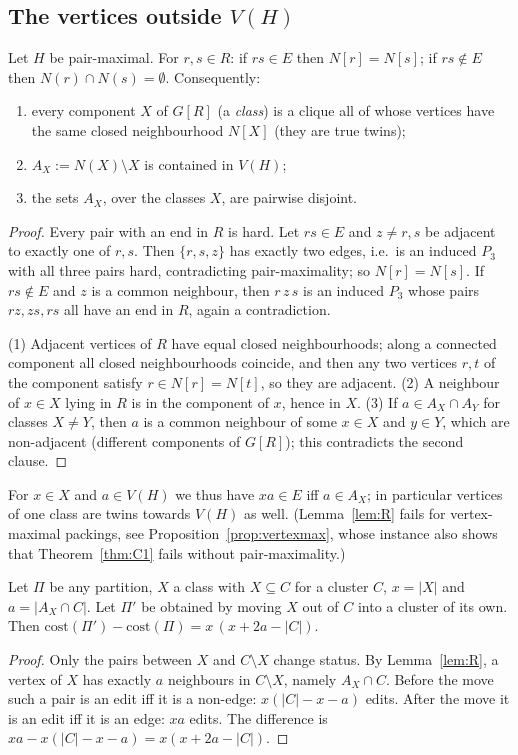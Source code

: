 \subsection{The vertices outside \texorpdfstring{$V(H)$}{V(H)}}
\begin{lemma}[Structure of $R$]\label{lem:R}
Let $H$ be pair-maximal. For $r,s\in R$: if $rs\in E$ then $N[r]=N[s]$; if $rs\notin E$ then $N(r)\cap N(s)=\emptyset$. Consequently:
\begin{enumerate}
\item every component $X$ of $G[R]$ (a \emph{class}) is a clique all of whose vertices have the same closed neighbourhood $N[X]$ (they are true twins);
\item $A_X:=N(X)\setminus X$ is contained in $V(H)$;
\item the sets $A_X$, over the classes $X$, are pairwise disjoint.
\end{enumerate}
\end{lemma}
\begin{proof}
Every pair with an end in $R$ is hard. Let $rs\in E$ and $z\ne r,s$ be adjacent to exactly one of $r,s$. Then $\{r,s,z\}$ has exactly two edges, i.e.\ is an induced $P_3$ with all three pairs hard, contradicting pair-maximality; so $N[r]=N[s]$. If $rs\notin E$ and $z$ is a common neighbour, then $r\,z\,s$ is an induced $P_3$ whose pairs $rz,zs,rs$ all have an end in $R$, again a contradiction.

(1) Adjacent vertices of $R$ have equal closed neighbourhoods; along a connected component all closed neighbourhoods coincide, and then any two vertices $r,t$ of the component satisfy $r\in N[r]=N[t]$, so they are adjacent. (2) A neighbour of $x\in X$ lying in $R$ is in the component of $x$, hence in $X$. (3) If $a\in A_X\cap A_Y$ for classes $X\ne Y$, then $a$ is a common neighbour of some $x\in X$ and $y\in Y$, which are non-adjacent (different components of $G[R]$); this contradicts the second clause.
\end{proof}
For $x\in X$ and $a\in V(H)$ we thus have $xa\in E$ iff $a\in A_X$; in particular vertices of one class are twins towards $V(H)$ as well. (Lemma~\ref{lem:R} fails for vertex-maximal packings, see Proposition~\ref{prop:vertexmax}, whose instance also shows that Theorem~\ref{thm:C1} fails without pair-maximality.)

\begin{lemma}\label{lem:exch}
Let $\Pi$ be any partition, $X$ a class with $X\subseteq C$ for a cluster $C$, $x=|X|$ and $a=|A_X\cap C|$. Let $\Pi'$ be obtained by moving $X$ out of $C$ into a cluster of its own. Then $\mathrm{cost}(\Pi')-\mathrm{cost}(\Pi)=x\,(x+2a-|C|)$.
\end{lemma}
\begin{proof}
Only the pairs between $X$ and $C\setminus X$ change status. By Lemma~\ref{lem:R}, a vertex of $X$ has exactly $a$ neighbours in $C\setminus X$, namely $A_X\cap C$. Before the move such a pair is an edit iff it is a non-edge: $x(|C|-x-a)$ edits. After the move it is an edit iff it is an edge: $xa$ edits. The difference is $xa-x(|C|-x-a)=x(x+2a-|C|)$.
\end{proof}

